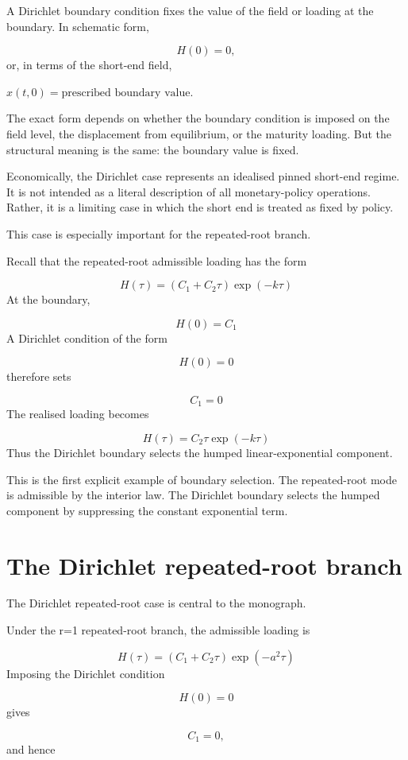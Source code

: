 \documentclass[11pt,oneside]{book}
\begin{document}
A Dirichlet boundary condition fixes the value of the field or loading
at the boundary. In schematic form,

\[
H(0)=0,
\]
or, in terms of the short-end field,

\begin{center}\(x(t,0)=\text{prescribed boundary value}\).\end{center}
The exact form depends on whether the boundary condition is imposed on
the field level, the displacement from equilibrium, or the maturity
loading. But the structural meaning is the same: the boundary value is
fixed.

Economically, the Dirichlet case represents an idealised pinned
short-end regime. It is not intended as a literal description of all
monetary-policy operations. Rather, it is a limiting case in which the
short end is treated as fixed by policy.

This case is especially important for the repeated-root branch.

Recall that the repeated-root admissible loading has the form

\[
H(\tau) = (C_1 + C_2\tau) \exp(-k\tau)
\]
At the boundary,

\[
H(0)=C_1
\]
A Dirichlet condition of the form

\[
H(0)=0
\]
therefore sets

\[
C_1=0
\]
The realised loading becomes

\[
H(\tau) = C_2\tau \exp(-k\tau)
\]
Thus the Dirichlet boundary selects the humped linear-exponential
component.

This is the first explicit example of boundary selection. The
repeated-root mode is admissible by the interior law. The Dirichlet
boundary selects the humped component by suppressing the constant
exponential term.

\section{The Dirichlet repeated-root branch}\label{the-dirichlet-repeated-root-branch}

The Dirichlet repeated-root case is central to the monograph.

Under the r=1 repeated-root branch, the admissible loading is

\[
H(\tau) = (C_1 + C_2\tau) \exp(-a^2\tau)
\]
Imposing the Dirichlet condition

\[
H(0)=0
\]
gives

\[
C_1=0,
\]
and hence
\end{document}
